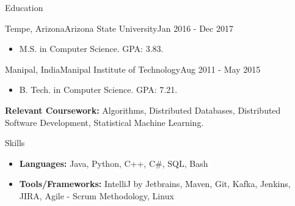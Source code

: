 \documentclass[]{dhruv_misra}
\begin{document}
	
	\begin{cvsection}{Education}
		\begin{cvsubsection}{Tempe, Arizona}{Arizona State University}{Jan 2016 - Dec 2017}
			\begin{itemize}
				\item M.S. in Computer Science. GPA: 3.83.
		\end{itemize}
		\end{cvsubsection}
		\begin{cvsubsection}{Manipal, India}{Manipal Institute of Technology}{Aug 2011 - May 2015}
			\begin{itemize}
				\item B. Tech. in Computer Science. GPA: 7.21.
		\end{itemize}
		\end{cvsubsection}
	\end{cvsection}
	\textbf{\:\: Relevant Coursework:} Algorithms, Distributed Databases, Distributed Software Development, Statistical Machine Learning.


	\begin{cvsection}{Skills}
		\begin{cvsubsection}{}{}{}	
			\begin{itemize}
				\item \textbf{Languages: } Java, Python, C++, C\#, SQL, Bash
				\item \textbf{Tools/Frameworks: } IntelliJ by Jetbrains, Maven, Git, Kafka, Jenkins, JIRA, Agile - Scrum Methodology, Linux
			\end{itemize}
		\end{cvsubsection}
	\end{cvsection}
\end{document}
